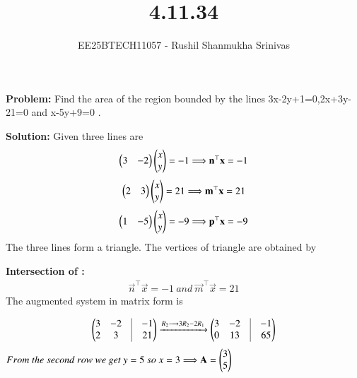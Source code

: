 \documentclass[journal]{IEEEtran}
\begin{document}




\title{4.11.34}
\author{EE25BTECH11057 - Rushil Shanmukha Srinivas
}
{\let\newpage\relax\maketitle}

\renewcommand{\thefigure}{\theenumi}
\renewcommand{\thetable}{\theenumi}
\setlength{\intextsep}{10pt} %

\renewcommand{\thetable}{\theenumi}
\newcommand{\absdet}[1]{\left|\det\!\left(#1\right)\right|}

\textbf{Problem:} Find the area of the region bounded by the lines 3x-2y+1=0,2x+3y-21=0 and x-5y+9=0 .

\textbf{Solution:}
Given three lines are
\begin{align}
\begin{pmatrix}3 & -2\end{pmatrix}\begin{pmatrix}x\\y\end{pmatrix} = -1 \Longrightarrow \mathbf{n}^\top\mathbf{x} = -1
\end{align}
\begin{align}
\begin{pmatrix}2 & 3\end{pmatrix}\begin{pmatrix}x\\y\end{pmatrix} = 21 \Longrightarrow \mathbf{m}^\top\mathbf{x} = 21
\end{align}
\begin{align}
\begin{pmatrix}1 & -5\end{pmatrix}\begin{pmatrix}x\\y\end{pmatrix} = -9 \Longrightarrow \mathbf{p}^\top\mathbf{x} = -9
\end{align}
The three lines form a triangle.
The vertices of triangle are obtained by 

\textbf{Intersection of :}
\begin{align}
\vec{n}^\top\vec{x} = -1 \ and \ \vec{m}^\top\vec{x} = 21 
\end{align}
The augmented system in matrix form is

\begin{align}
\myvec{
3 & -2 &\vrule& -1\\
2 & 3 &\vrule& 21} \xrightarrow{R_2 \longrightarrow 3R_2-2R_1}
\myvec{
3 & -2 &\vrule& -1\\
0 & 13 &\vrule& 65}
\end{align}
$ From \ the \ second \ row \ we \ get\ y=5 \ so \ x=3 \Longrightarrow
\vec{A} = \myvec{3\\5}$
\end{document}
